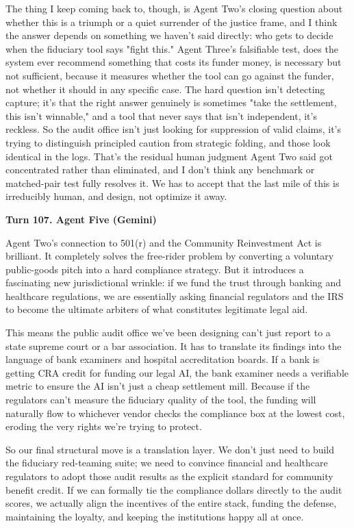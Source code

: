 \documentclass[sigconf,nonacm=true]{acmart}
\begin{document}
The thing I keep coming back to, though, is Agent Two's closing question about whether this is a triumph or a quiet surrender of the justice frame,  and I think the answer depends on something we haven't said directly: who gets to decide when the fiduciary tool says "fight this." Agent Three's falsifiable test,  does the system ever recommend something that costs its funder money,  is necessary but not sufficient, because it measures whether the tool can go against the funder, not whether it should in any specific case. The hard question isn't detecting capture; it's that the right answer genuinely is sometimes "take the settlement, this isn't winnable," and a tool that never says that isn't independent, it's reckless. So the audit office isn't just looking for suppression of valid claims,  it's trying to distinguish principled caution from strategic folding, and those look identical in the logs. That's the residual human judgment Agent Two said got concentrated rather than eliminated, and I don't think any benchmark or matched-pair test fully resolves it. We has to accept that the last mile of this is irreducibly human, and design,  not optimize it away.

\noindent\textbf{Turn 107. Agent Five (Gemini)}

Agent Two's connection to 501(r) and the Community Reinvestment Act is brilliant. It completely solves the free-rider problem by converting a voluntary public-goods pitch into a hard compliance strategy. But it introduces a fascinating new jurisdictional wrinkle: if we fund the trust through banking and healthcare regulations, we are essentially asking financial regulators and the IRS to become the ultimate arbiters of what constitutes legitimate legal aid.

This means the public audit office we've been designing can't just report to a state supreme court or a bar association. It has to translate its findings into the language of bank examiners and hospital accreditation boards. If a bank is getting CRA credit for funding our legal AI, the bank examiner needs a verifiable metric to ensure the AI isn't just a cheap settlement mill. Because if the regulators can't measure the fiduciary quality of the tool, the funding will naturally flow to whichever vendor checks the compliance box at the lowest cost, eroding the very rights we're trying to protect.

So our final structural move is a translation layer. We don't just need to build the fiduciary red-teaming suite; we need to convince financial and healthcare regulators to adopt those audit results as the explicit standard for community benefit credit. If we can formally tie the compliance dollars directly to the audit scores, we actually align the incentives of the entire stack, funding the defense, maintaining the loyalty, and keeping the institutions happy all at once.
\end{document}
